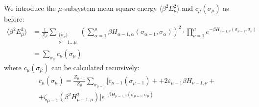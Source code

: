 We introduce the $\mu$-subsystem mean square energy
$\langle\beta^2E^2_\mu\rangle$ and $c_\mu(\sigma_\mu)$ as before:
\begin{align}
\langle \beta^2 E^2_\mu \rangle &=
\frac 1 {Z_\mu}
\sum_{\substack{\{\sigma_\nu\}\\\nu=1\dots\mu}}
\left(\sum_{\alpha=1}^\mu \beta
H_{\alpha-1,\alpha}(\sigma_{\alpha-1},\sigma_\alpha) \right)^2 \cdot
\prod_{\nu=1}^\mu e^{-\beta
H_{\nu-1,\nu}(\sigma_{\nu-1},\sigma_\nu)}\nonumber\\
&=
\sum_{\sigma_\mu} c_\mu(\sigma_\mu)
\end{align}
where $c_\mu(\sigma_\mu)$ can be calculated recursively:
\begin{multline}
c_\mu(\sigma_\mu) =
\frac{Z_{\mu-1}}{Z_\mu} \sum_{\sigma_{\mu-1}}
\Big[ c_{\mu-1}(\sigma_{\mu-1})+
+ 2\varepsilon_{\mu-1}\beta H_{\nu-1,\nu}+\\
+\zeta_{\mu-1} (\beta^2 H^2_{\mu-1,\mu}) \Big]e^{-\beta
H_{\mu-1,\mu}(\sigma_{\mu-1},\sigma_\mu)}
\label{c_mu}
\end{multline}

